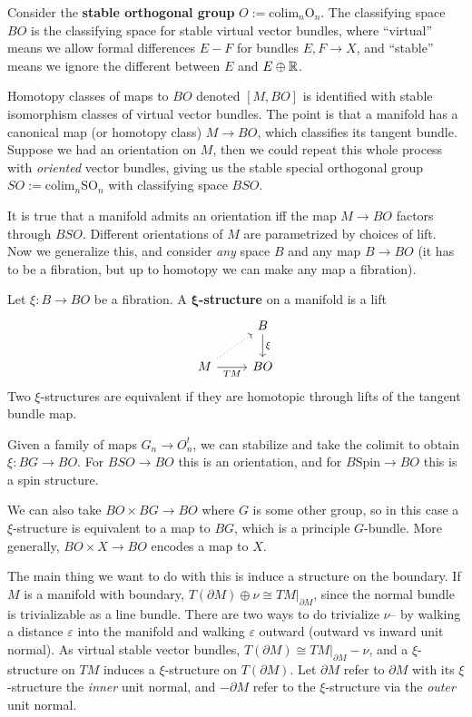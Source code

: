 \begin{definition}[]
    Consider the \textbf{stable orthogonal group} $O:= \mathrm{colim}_n \mathrm{O}_n $. The classifying space $BO$ is the classifying space for stable virtual vector bundles, where ``virtual'' means we allow formal differences $E-F$ for bundles $E,F \to X$, and ``stable'' means we ignore the different between $E$ and $E\oplus \mathbb{R}$. 
\end{definition}
Homotopy classes of maps to $BO$ denoted $[M,BO]$ is identified with stable isomorphism classes of virtual vector bundles. The point is that a manifold has a canonical map (or homotopy class) $M \to BO$, which classifies its tangent bundle. Suppose we had an orientation on $M$, then we could repeat this whole process with \emph{oriented} vector bundles, giving us the stable special orthogonal group $SO:= \mathrm{colim}_n \mathrm{SO}_n $ with classifying space $BSO$.

It is true that a manifold admits an orientation iff the map $M \to BO$ factors through $BSO$. Different orientations of $M$ are parametrized by choices of lift. Now we generalize this, and consider \emph{any} space $B$ and any map $B \to BO$ (it has to be a fibration, but up to homotopy we can make any map a fibration).
\begin{definition}[]
    Let $\xi \colon B \to BO$ be a fibration. A $\mathbf \xi$\textbf{-structure} on a manifold is a lift \[
    \begin{tikzcd}
   & B\arrow[d,"\xi"]\\
        M \arrow[r,"TM"']\arrow[ru,dotted] & BO
    \end{tikzcd}\] 
    Two $\xi$-structures are equivalent if they are homotopic through lifts of the tangent bundle map.
\end{definition}
\begin{example}
Given a family of maps $G_n  \to O_n ^t$, we can stabilize and take the colimit to obtain $\xi \colon BG \to BO$. For $BSO \to BO$ this is an orientation, and for $B \mathrm{Spin}\to BO$ this is a spin structure.
\end{example}
\begin{example}
    We can also take $BO \times BG \to BO$ where $G$ is some other group, so in this case a $\xi$-structure is equivalent to a map to $BG$, which is a principle $G$-bundle. More generally, $BO \times X\to BO$ encodes a map to $X$.
\end{example}
The main thing we want to do with this is induce a structure on the boundary. If $M$ is a manifold with boundary, $T(\partial M)\oplus \nu \cong\left. TM \right| _{\partial M}$, since the normal bundle is trivializable as a line bundle. There are two ways to do trivialize $\nu$-- by walking a distance $\varepsilon $ into the manifold and walking $\varepsilon $ outward (outward vs inward unit normal). As virtual stable vector bundles, $T(\partial M) \cong \left. TM \right| _{\partial M}-\nu$, and a $\xi$-structure on $TM$ induces a $\xi$-structure on $T(\partial M)$. Let $\partial M$ refer to $\partial M$ with its $\xi$-structure the \emph{inner} unit normal, and $-\partial M$ refer to the $\xi$-structure via the \emph{outer} unit normal.

